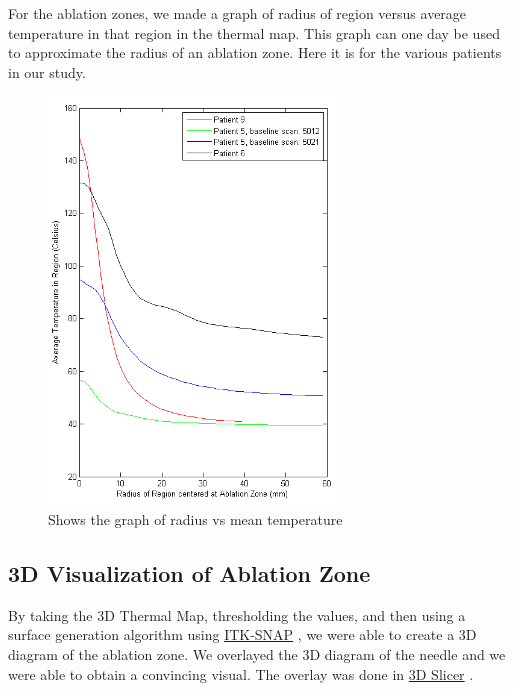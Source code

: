 \documentclass[]{spie}  %
\begin{document}
For the ablation zones, we made a graph of radius of region versus average temperature in that region in the thermal map. This graph can one day be used to approximate the radius of an ablation zone. Here it is for the various patients in our study. 

\begin{figure} 
\centering 
\includegraphics[width=3in]{meanTempVsRadiusFull.png} 
\caption{Shows the graph of radius vs mean temperature} 
\end{figure}


\subsection{3D Visualization of Ablation Zone}

By taking the 3D Thermal Map, thresholding the values, and then using a surface generation algorithm using \href{www.itksnap.org}{ITK-SNAP} \cite{Yushkevich06}, we were able to create a 3D diagram of the ablation zone. We overlayed the 3D diagram of the needle and we were able to obtain a convincing visual. The overlay was done in \href{http://www.slicer.org/}{3D Slicer} \cite{Fedorov12}. 
\end{document}
